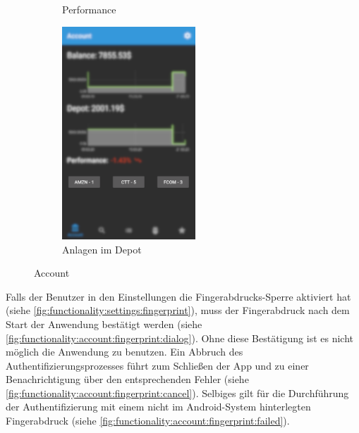 \documentclass[a4paper]{article}
\begin{document}
\begin{figure}[H]
\begin{subfigure}{.5\textwidth}
        \caption{Performance}
        \label{fig:functionality:account:performance}
    \end{subfigure}
    \begin{subfigure}{.5\textwidth}
        \centering
        \includegraphics[height=8cm,keepaspectratio]{./images/account/depot_quotes.png}
        \caption{Anlagen im Depot}
        \label{fig:functionality:account:depot_quotes}
    \end{subfigure}
    \caption{Account}
    \label{fig:functionality:account}
\end{figure}

Falls der Benutzer in den Einstellungen die Fingerabdrucks-Sperre aktiviert hat (siehe \autoref{fig:functionality:settings:fingerprint}), muss der Fingerabdruck nach dem Start der Anwendung bestätigt werden (siehe \autoref{fig:functionality:account:fingerprint:dialog}).
Ohne diese Bestätigung ist es nicht möglich die Anwendung zu benutzen.
Ein Abbruch des Authentifizierungsprozesses führt zum Schließen der App und zu einer Benachrichtigung über den entsprechenden Fehler (siehe \autoref{fig:functionality:account:fingerprint:cancel}).
Selbiges gilt für die Durchführung der Authentifizierung mit einem nicht im Android-System hinterlegten Fingerabdruck (siehe \autoref{fig:functionality:account:fingerprint:failed}).
\end{document}
